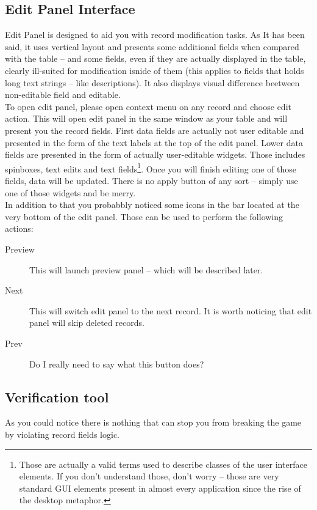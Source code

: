 \subsection{Edit Panel Interface}
Edit Panel is designed to aid you with record modification tasks. As It has been said, it uses vertical layout and presents some additional fields when compared with the table -- and some fields, even if they are actually displayed in the table, clearly ill-suited for modification isnide of them (this applies to fields that holds long text strings -- like descriptions). It also displays visual difference beetween non-editable field and editable.\\
To open edit panel, please open context menu on any record and choose edit action. This will open edit panel in the same window as your table and will present you the record fields. First data fields are actually not user editable and presented in the form of the text labels at the top of the edit panel. Lower data fields are presented in the form of actually user-editable widgets. Those includes spinboxes, text edits and text fields\footnote{Those are actually a valid terms used to describe classes of the user interface elements. If you don't understand those, don't worry -- those are very standard {GUI} elements present in almost every application since the rise of the desktop metaphor.}. Once you will finish editing one of those fields, data will be updated. There is no apply button of any sort -- simply use one of those widgets and be merry.\\
In addition to that you probabbly noticed some icons in the bar located at the very bottom of the edit panel. Those can be used to perform the following actions:

\begin{description}
  \item[Preview] This will launch preview panel -- which will be described later.
  \item[Next] This will switch edit panel to the next record. It is worth noticing that edit panel will skip deleted records.
  \item[Prev] Do I really need to say what this button does?
\end{description}

\subsection{Verification tool}
As you could notice there is nothing that can stop you from breaking the game by violating record fields logic.
